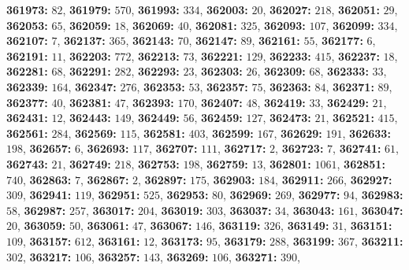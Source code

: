 \textsf{\bfseries 361973:} $82$, \textsf{\bfseries 361979:} $570$, \textsf{\bfseries 361993:} $334$, \textsf{\bfseries 362003:} $20$, \textsf{\bfseries 362027:} $218$, \textsf{\bfseries 362051:} $29$, \textsf{\bfseries 362053:} $65$, \textsf{\bfseries 362059:} $18$, \textsf{\bfseries 362069:} $40$, \textsf{\bfseries 362081:} $325$, \textsf{\bfseries 362093:} $107$, \textsf{\bfseries 362099:} $334$, \textsf{\bfseries 362107:} $7$, \textsf{\bfseries 362137:} $365$, \textsf{\bfseries 362143:} $70$, \textsf{\bfseries 362147:} $89$, \textsf{\bfseries 362161:} $55$, \textsf{\bfseries 362177:} $6$, \textsf{\bfseries 362191:} $11$, \textsf{\bfseries 362203:} $772$, \textsf{\bfseries 362213:} $73$, \textsf{\bfseries 362221:} $129$, \textsf{\bfseries 362233:} $415$, \textsf{\bfseries 362237:} $18$, \textsf{\bfseries 362281:} $68$, \textsf{\bfseries 362291:} $282$, \textsf{\bfseries 362293:} $23$, \textsf{\bfseries 362303:} $26$, \textsf{\bfseries 362309:} $68$, \textsf{\bfseries 362333:} $33$, \textsf{\bfseries 362339:} $164$, \textsf{\bfseries 362347:} $276$, \textsf{\bfseries 362353:} $53$, \textsf{\bfseries 362357:} $75$, \textsf{\bfseries 362363:} $84$, \textsf{\bfseries 362371:} $89$, \textsf{\bfseries 362377:} $40$, \textsf{\bfseries 362381:} $47$, \textsf{\bfseries 362393:} $170$, \textsf{\bfseries 362407:} $48$, \textsf{\bfseries 362419:} $33$, \textsf{\bfseries 362429:} $21$, \textsf{\bfseries 362431:} $12$, \textsf{\bfseries 362443:} $149$, \textsf{\bfseries 362449:} $56$, \textsf{\bfseries 362459:} $127$, \textsf{\bfseries 362473:} $21$, \textsf{\bfseries 362521:} $415$, \textsf{\bfseries 362561:} $284$, \textsf{\bfseries 362569:} $115$, \textsf{\bfseries 362581:} $403$, \textsf{\bfseries 362599:} $167$, \textsf{\bfseries 362629:} $191$, \textsf{\bfseries 362633:} $198$, \textsf{\bfseries 362657:} $6$, \textsf{\bfseries 362693:} $117$, \textsf{\bfseries 362707:} $111$, \textsf{\bfseries 362717:} $2$, \textsf{\bfseries 362723:} $7$, \textsf{\bfseries 362741:} $61$, \textsf{\bfseries 362743:} $21$, \textsf{\bfseries 362749:} $218$, \textsf{\bfseries 362753:} $198$, \textsf{\bfseries 362759:} $13$, \textsf{\bfseries 362801:} $1061$, \textsf{\bfseries 362851:} $740$, \textsf{\bfseries 362863:} $7$, \textsf{\bfseries 362867:} $2$, \textsf{\bfseries 362897:} $175$, \textsf{\bfseries 362903:} $184$, \textsf{\bfseries 362911:} $266$, \textsf{\bfseries 362927:} $309$, \textsf{\bfseries 362941:} $119$, \textsf{\bfseries 362951:} $525$, \textsf{\bfseries 362953:} $80$, \textsf{\bfseries 362969:} $269$, \textsf{\bfseries 362977:} $94$, \textsf{\bfseries 362983:} $58$, \textsf{\bfseries 362987:} $257$, \textsf{\bfseries 363017:} $204$, \textsf{\bfseries 363019:} $303$, \textsf{\bfseries 363037:} $34$, \textsf{\bfseries 363043:} $161$, \textsf{\bfseries 363047:} $20$, \textsf{\bfseries 363059:} $50$, \textsf{\bfseries 363061:} $47$, \textsf{\bfseries 363067:} $146$, \textsf{\bfseries 363119:} $326$, \textsf{\bfseries 363149:} $31$, \textsf{\bfseries 363151:} $109$, \textsf{\bfseries 363157:} $612$, \textsf{\bfseries 363161:} $12$, \textsf{\bfseries 363173:} $95$, \textsf{\bfseries 363179:} $288$, \textsf{\bfseries 363199:} $367$, \textsf{\bfseries 363211:} $302$, \textsf{\bfseries 363217:} $106$, \textsf{\bfseries 363257:} $143$, \textsf{\bfseries 363269:} $106$, \textsf{\bfseries 363271:} $390$, 
